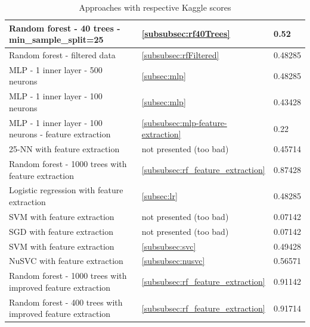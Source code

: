\documentclass[a4paper, 11pt, oneside]{article}
\begin{document}
\begin{table}[H]
{\begin{tabular}{|l|l|l|}
Random forest - 40 trees - min\_sample\_split=25            & \ref{subsubsec:rf40Trees}                    & 0.52                                       \\ \hline
Random forest - filtered data                               & \ref{subsubsec:rfFiltered}                   & 0.48285                                    \\ \hline
MLP - 1 inner layer - 500 neurons                           & \ref{subsec:mlp}                               & 0.48285                                    \\ \hline
MLP - 1 inner layer - 100 neurons                           & \ref{subsec:mlp}                                 & 0.43428                                    \\ \hline
MLP - 1 inner layer - 100 neurons - feature extraction      & \ref{subsubsec:mlp-feature-extraction}                                  & 0.22                                       \\ \hline
25-NN with feature extraction                               & not presented (too bad)                               & 0.45714                                    \\ \hline
Random forest - 1000 trees with feature extraction          & \ref{subsubsec:rf_feature_extraction}                                & 0.87428                                    \\ \hline
Logistic regression with feature extraction                 & \ref{subsec:lr}                               & 0.48285                                    \\ \hline
SVM with feature extraction                                 & not presented (too bad)                                 & 0.07142                                    \\ \hline
SGD with feature extraction                                 & not presented (too bad)                                  & 0.07142                                    \\ \hline
SVM with feature extraction                                 & \ref{subsubsec:svc}                          & 0.49428                                    \\ \hline
NuSVC with feature extraction                               & \ref{subsubsec:nusvc}                        & 0.56571                                    \\ \hline
Random forest - 1000 trees with improved feature extraction & \ref{subsubsec:rf_feature_extraction}                                 & 0.91142                                    \\ \hline
Random forest - 400 trees with improved feature extraction & \ref{subsubsec:rf_feature_extraction}                                 & 0.91714                                   \\ \hline
\end{tabular}
}
\caption{Approaches with respective Kaggle scores}
\end{table}
\end{document}
